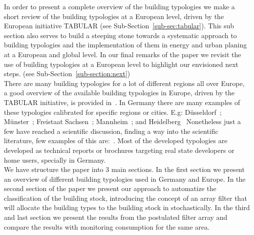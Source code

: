 \documentclass[authoryear,preprint,review,12pt]{elsarticle}
\begin{document}
\begin{linenumbers}
In order to present a complete overview of the building typologies we make a
short review of the building typologies at a European level, driven by the
European initiative TABULAR (see Sub-Section~\ref{sub-sec:tabular}).  This sub
section also serves to build a steeping stone towards a systematic approach to
building typologies and the implementation of them in energy and urban planing
at a European and global level.  In our final remarks of the paper we revisit
the use of building typologies at a European level to highlight our envisioned
next steps.  (see Sub-Section~\ref{sub-section:next})\\

There are many building typologies for a lot of different regions all over
Europe, a good overview of the available building typologies in Europe, driven
by the TABULAR initiative, is provided in~\cite{TABULAProjectTeam.2010}.  In
Germany there are many examples of these typologies calibrated for specific
regions or cities.  E.g:  D{\"u}sseldorf~\cite{ebok.2005};
M{\"u}nster~\cite{Hildebrandt.2003}; Freistaat Sachsen~\cite{ebok.2000};
Mannheim~\cite{ebokifeu.1998}; and Heidelberg~\cite{ebokifeu.1996} Nonetheless
just a few have reached a scientific discussion, finding a way into the
scientific literature, few examples of this are:~\cite{Kragh.2013,
    Singh.2013, Hrabovszky.2013, Caputo.2013}.
Most of the developed typologies are developed as technical reports or
brochures targeting real state developers or home users, specially in
Germany.\\

We have structure the paper into 3 main sections.  In the first section we
present an overview of different building typologies used in Germany and
Europe.  In the second section of the paper we present our approach to
automatize the classification of the building stock, introducing the concept of
an array filter that will allocate the building types to the building stock in
stochastically. In the third and last section we present the results from
the postulated filter array and compare the results with monitoring consumption
for the same area.\\


\end{linenumbers}
\end{document}
